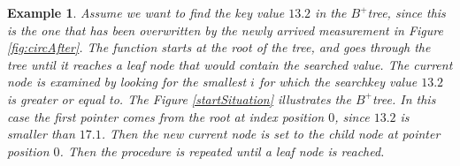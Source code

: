 \documentclass[abstracton,12pt]{scrreprt}
\newtheorem{example}{Example}
\begin{document}
\begin{example}
	Assume we want to find the key value $13.2$ in the $B^+$tree, since this is the one that has been overwritten by the newly arrived measurement in Figure \ref{fig:circAfter}. The function starts at the root of the tree, and goes through the tree until it reaches a leaf node that would contain the searched value. 
	The current node is examined by looking for the smallest $i$ for which the searchkey value $13.2$ is greater or equal to. The Figure \ref{startSituation} illustrates the  $B^+$tree. In this case the first pointer comes from the root at index position $0$, since $13.2$ is smaller than $17.1$. Then the new current node is set to the child node at pointer position $0$. Then the procedure is repeated until a leaf node is reached. 
\end{example} 
\end{document}
